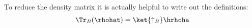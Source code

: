 To reduce the density matrix it is actually helpful to write out the definitions:
\begin{align}
\Tr_B(\rhohat) = \ket{\uparrow_B}\hrhoha
\end{align}